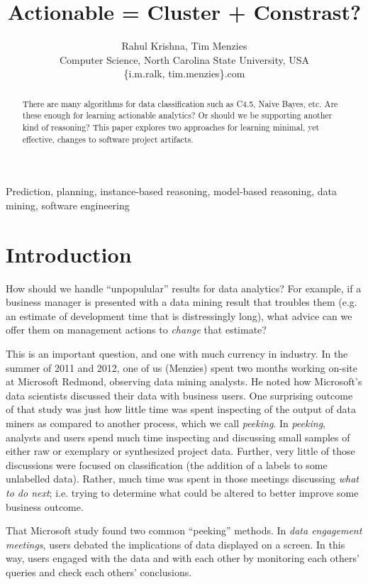 \documentclass[conference]{IEEEtran}
\title{Actionable = Cluster + Constrast?}
\author{Rahul Krishna, Tim Menzies\\
	Computer Science, North Carolina State University, USA\\
	\{i.m.ralk, tim.menzies\}\@gmail.com
	
}
\begin{document}
	\maketitle
	\begin{abstract}
		There are many
		algorithms for data  classification such as  C4.5, Naive Bayes, etc.
		Are these enough for learning actionable analytics? Or should we be supporting
		another kind of reasoning? This paper explores
		two approaches for learning minimal, yet effective,  changes to software
		project artifacts.
	\end{abstract}
	\begin{IEEEkeywords}
		Prediction, planning, instance-based reasoning, model-based reasoning, data mining, software engineering
	\end{IEEEkeywords}
	
	\section{Introduction} 
	How should we handle ``unpopulular'' results
	for data analytics? For example, if a business manager is presented
	with a data mining result that troubles them (e.g. an estimate of
	development time that is distressingly long), what advice
	can we offer them on management actions to {\em change} that estimate?
	
	This is an important question, and one with much currency in industry.
	In the summer of 2011 and 2012, one of us (Menzies) spent two months
	working on-site at Microsoft Redmond,
	observing data mining analysts.  He
	noted how Microsoft's data scientists
	discussed their data with  business users. 
	One surprising outcome of that study was just how
	little time was spent  
	inspecting  of the output of data miners as compared to another process, which we call {\em peeking}.
	In {\em peeking}, analysts and users spend much time
	inspecting and discussing small samples of either raw or exemplary or synthesized project data.  Further, very little of those discussions were  focused on classification
	(the addition of a labels to some unlabelled data). Rather, much time
	was spent in those meetings discussing {\em what to do next}; i.e. trying
	to determine what could be altered to better improve some business outcome.
	
	That   Microsoft  study found two common ``peeking'' methods.
	In {\em data engagement meetings},
	users debated the implications of data
	displayed on a screen. In this way, users
	engaged with the data and with each other by
	monitoring each others' queries and check each others'
	conclusions.
	
\end{document}
